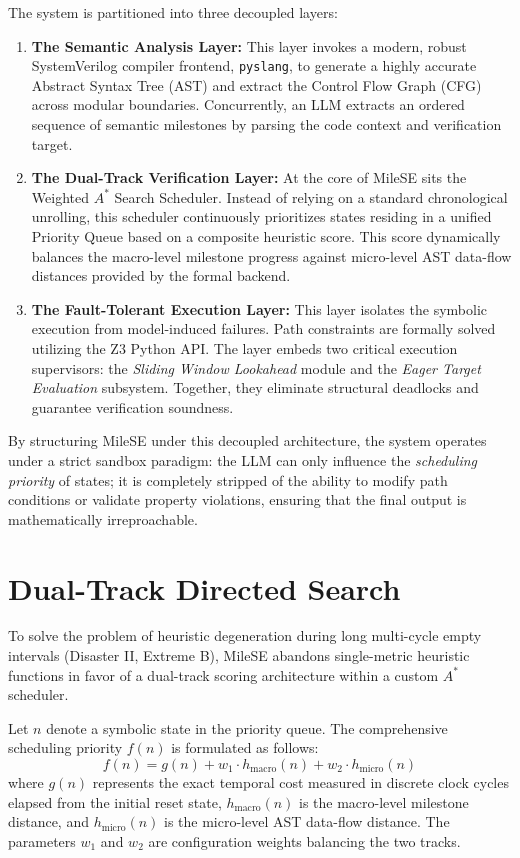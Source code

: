 \documentclass[conference]{IEEEtran}
\begin{document}
The system is partitioned into three decoupled layers:
\begin{enumerate}
    \item \textbf{The Semantic Analysis Layer:} This layer invokes a modern, robust SystemVerilog compiler frontend, \texttt{pyslang}, to generate a highly accurate Abstract Syntax Tree (AST) and extract the Control Flow Graph (CFG) across modular boundaries. Concurrently, an LLM extracts an ordered sequence of semantic milestones by parsing the code context and verification target.
    \item \textbf{The Dual-Track Verification Layer:} At the core of MileSE sits the Weighted $A^*$ Search Scheduler. Instead of relying on a standard chronological unrolling, this scheduler continuously prioritizes states residing in a unified Priority Queue based on a composite heuristic score. This score dynamically balances the macro-level milestone progress against micro-level AST data-flow distances provided by the formal backend.
    \item \textbf{The Fault-Tolerant Execution Layer:} This layer isolates the symbolic execution from model-induced failures. Path constraints are formally solved utilizing the Z3 Python API. The layer embeds two critical execution supervisors: the \textit{Sliding Window Lookahead} module and the \textit{Eager Target Evaluation} subsystem. Together, they eliminate structural deadlocks and guarantee verification soundness.
\end{enumerate}

By structuring MileSE under this decoupled architecture, the system operates under a strict sandbox paradigm: the LLM can only influence the \textit{scheduling priority} of states; it is completely stripped of the ability to modify path conditions or validate property violations, ensuring that the final output is mathematically irreproachable.

\section{Dual-Track Directed Search}
\label{sec:search}
To solve the problem of heuristic degeneration during long multi-cycle empty intervals (Disaster II, Extreme B), MileSE abandons single-metric heuristic functions in favor of a dual-track scoring architecture within a custom $A^*$ scheduler.

Let $n$ denote a symbolic state in the priority queue. The comprehensive scheduling priority $f(n)$ is formulated as follows:
\begin{equation}
    f(n) = g(n) + w_1 \cdot h_{\text{macro}}(n) + w_2 \cdot h_{\text{micro}}(n)
\end{equation}
where $g(n)$ represents the exact temporal cost measured in discrete clock cycles elapsed from the initial reset state, $h_{\text{macro}}(n)$ is the macro-level milestone distance, and $h_{\text{micro}}(n)$ is the micro-level AST data-flow distance. The parameters $w_1$ and $w_2$ are configuration weights balancing the two tracks.
\end{document}
